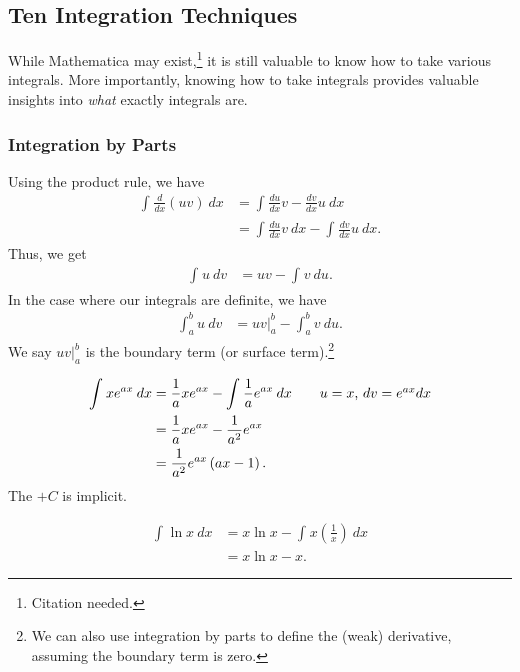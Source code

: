 \documentclass[10pt]{mypackage}
\begin{document}
\subsection{Ten Integration Techniques}%
While Mathematica may exist,\footnote{Citation needed.} it is still valuable to know how to take various integrals. More importantly, knowing how to take integrals provides valuable insights into \textit{what} exactly integrals are.
\subsubsection{Integration by Parts}%
\begin{definition}
  Using the product rule, we have
  \begin{align*}
    \int_{}^{} \frac{d}{dx}\left(uv\right)\:dx &= \int_{}^{} \frac{du}{dx}v - \frac{dv}{dx}u\:dx\\
                                               &= \int_{}^{} \frac{du}{dx}v\:dx - \int_{}^{} \frac{dv}{dx}u\:dx.
  \end{align*}
  Thus, we get
  \begin{align*}
    \int_{}^{} u\:dv &= uv - \int_{}^{} v\:du.
  \end{align*}
  In the case where our integrals are definite, we have
  \begin{align*}
    \int_{a}^{b} u\:dv &= uv\bigr\vert_{a}^{b} - \int_{a}^{b} v\:du.
  \end{align*}
  We say $uv\bigr\vert_{a}^{b}$ is the boundary term (or surface term).\footnote{We can also use integration by parts to define the (weak) derivative, assuming the boundary term is zero.}
\end{definition}
\begin{example}
  \begin{align*}
    \int_{}^{} xe^{ax}\:dx &= \frac{1}{a}xe^{ax} - \int_{}^{} \frac{1}{a}e^{ax}\:dx\tag*{$u = x$, $dv = e^{ax}dx$}\\
                           &= \frac{1}{a}xe^{ax} - \frac{1}{a^2}e^{ax}\\
                           &= \frac{1}{a^2}e^{ax}\left(ax - 1\right).
  \end{align*}
  The $+C$ is implicit.
\end{example}
\begin{example}
  \begin{align*}
    \int_{}^{} \ln x\:dx &= x\ln x - \int_{}^{} x\left(\frac{1}{x}\right)\:dx\tag*{$u = \ln x$, $dv = dx$}\\
                         &= x\ln x - x.
  \end{align*}
\end{example}
\end{document}
